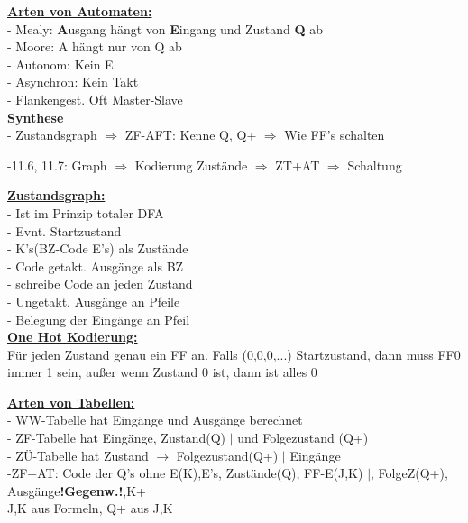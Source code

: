 \documentclass[8pt]{extarticle}
\begin{document}
\begin{minipage}{0.33\textwidth}

\underline{\textbf{Arten von Automaten:}}\\
- Mealy: \textbf{A}usgang hängt von \textbf{E}ingang und Zustand \textbf{Q} ab \\
- Moore: A hängt nur von Q ab \\
- Autonom: Kein E \\
- Asynchron: Kein Takt \\
- Flankengest. Oft Master-Slave \\

\underline{\textbf{Synthese}}\\
- Zustandsgraph $\Rightarrow$ ZF-AFT: Kenne Q, Q+ $\Rightarrow$ Wie FF's schalten

-11.6, 11.7: Graph $\Rightarrow$ Kodierung Zustände $\Rightarrow$ ZT+AT $\Rightarrow$ Schaltung
\vspace{5cm}

\underline{\textbf{Zustandsgraph:}}\\
- Ist im Prinzip totaler DFA\\
- Evnt. Startzustand\\
- K's(BZ-Code E's) als Zustände\\
- Code getakt. Ausgänge als BZ\\
- schreibe Code an jeden Zustand\\
- Ungetakt. Ausgänge an Pfeile\\
- Belegung der Eingänge an Pfeil\\

\underline{\textbf{One Hot Kodierung:}}\\
Für jeden Zustand genau ein FF an. Falls (0,0,0,...) Startzustand, dann muss FF0 immer 1 sein, außer wenn Zustand 0 ist, dann ist alles 0
\end{minipage}%

\vspace*{-0.3 cm}
\underline{\textbf{Arten von Tabellen:}}\\
- WW-Tabelle hat Eingänge und Ausgänge berechnet\\
- ZF-Tabelle hat Eingänge, Zustand(Q) $|$ und Folgezustand (Q+)\\
- ZÜ-Tabelle hat Zustand $\rightarrow$ Folgezustand(Q+) $|$ Eingänge\\
-ZF+AT: Code der Q's ohne E(K),E's, Zustände(Q), FF-E(J,K) $|$, FolgeZ(Q+), Ausgänge\textbf{!Gegenw.!},K+\\
\phantom{ss} J,K aus Formeln, Q+ aus J,K
\end{document}
